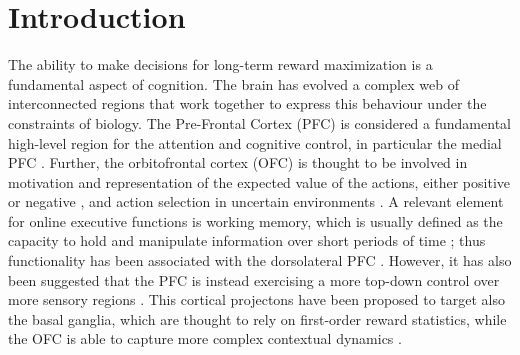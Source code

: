 
\section{Introduction}
\hfill \break
\vspace {0.5cm}

The ability to make decisions for long-term reward maximization is a fundamental aspect of cognition. The brain has evolved a complex web of interconnected regions that work together to express this behaviour under the constraints of biology. The Pre-Frontal Cortex (PFC) is considered
a fundamental high-level region for the attention and cognitive control, in particular the medial PFC \cite{millerIntegrativeTheoryPrefrontal2001a, sheynikhovichLongtermMemorySynaptic2023}.
Further, the orbitofrontal cortex (OFC) is thought to be involved in motivation and representation of the expected value of the actions, either positive or negative  \cite{odohertyAbstractRewardPunishment2001, ricebergRewardStabilityDetermines2012, tremblayRelativeRewardPreference1999}, and action
selection in uncertain environments \cite{elliottDissociableFunctionsMedial2000}.
A relevant element for online executive functions is working memory, which is usually defined as the capacity to hold and manipulate information over short periods of time \cite{baddeleyWorkingMemory1974}; thus functionality 
 has been associated with the dorsolateral PFC \cite{dardenneRolePrefrontalCortex2012, cohenTemporalDynamicsBrain1997, constantinidisPersistentSpikingActivity2018, zylberbergMechanismsPersistentActivity2017}.
 However, it has also been suggested that the PFC is instead exercising a more top-down control over more sensory regions \cite{laraRolePrefrontalCortex2015}. This cortical projectons have been proposed to target also the basal ganglia, which are thought to rely on first-order reward statistics,
 while the OFC is able to capture more complex contextual dynamics \cite{frankAnatomyDecisionStriatoorbitofrontal2006}.

